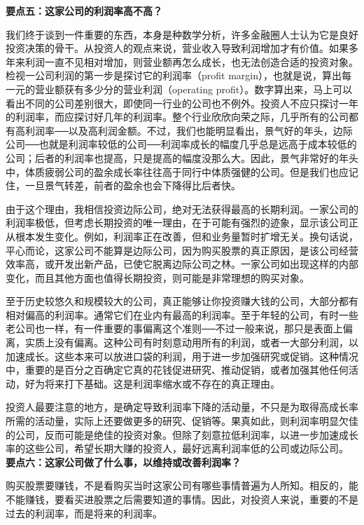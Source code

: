 \documentclass[UTF8,a4paper,zihao=-4,fontset = windows]{ctexart} %
\begin{document}
\textbf{要点五：这家公司的利润率高不高？}


我们终于谈到一件重要的东西，本身是种数学分析，许多金融圈人士认为它是良好投资决策的骨干。从投资人的观点来说，营业收入导致利润增加才有价值。如果多年来利润一直不见相对增加，则营业额再怎么成长，也无法创造合适的投资对象。检视一公司利润的第一步是探讨它的利润率（profit margin），也就是说，算出每一元的营业额获有多少分的营业利润（operating profit）。数字算出来，马上可以看出不同的公司差别很大，即使同一行业的公司也不例外。投资人不应只探讨一年的利润率，而应探讨好几年的利润率。整个行业欣欣向荣之际，几乎所有的公司都有高利润率──以及高利润金额。不过，我们也能明显看出，景气好的年头，边际公司──也就是利润率较低的公司──利润率成长的幅度几乎总是远高于成本较低的公司；后者的利润率也提高，只是提高的幅度没那么大。因此，景气非常好的年头中，体质疲弱公司的盈余成长率往往高于同行中体质强健的公司。但是我们也应记住，一旦景气转差，前者的盈余也会下降得比后者快。

由于这个理由，我相信投资边际公司，绝对无法获得最高的长期利润。一家公司的利润率极低，但考虑长期投资的唯一理由，在于可能有强烈的迹象，显示该公司正从根本发生变化。例如，利润率正在改善，但和业务量暂时扩增无关。换句话说，平心而论，这家公司不能算是边际公司，因为购买股票的真正原因，是该公司经营效率高，或开发出新产品，已使它脱离边际公司之林。一家公司如出现这样的内部变化，而且其他方面也值得长期投资，则可能是非常理想的购买对象。

至于历史较悠久和规模较大的公司，真正能够让你投资赚大钱的公司，大部分都有相对偏高的利润率。通常它们在业内有最高的利润率。至于年轻的公司，有时一些老公司也一样，有一件重要的事偏离这个准则──不过一般来说，那只是表面上偏离，实质上没有偏离。这种公司有时刻意动用所有的利润，或者一大部分利润，以加速成长。这些本来可以放进口袋的利润，用于进一步加强研究或促销。这种情况中，重要的是百分之百确定它真的花钱促进研究、推动促销，或者加强其他任何活动，好为将来打下基础。这是利润率缩水或不存在的真正理由。

投资人最要注意的地方，是确定导致利润率下降的活动量，不只是为取得高成长率所需的活动量，实际上还要做更多的研究、促销等。果真如此，则利润率明显欠佳的公司，反而可能是绝佳的投资对象。但除了刻意拉低利润率，以进一步加速成长率的这些公司，希望长期大赚的投资人，最好远离利润率低的公司或边际公司。
\\

\textbf{要点六：这家公司做了什么事，以维持或改善利润率？}


购买股票要赚钱，不是看购买当时这家公司有哪些事情普遍为人所知。相反的，能不能赚钱，要看买进股票之后需要知道的事情。因此，对投资人来说，重要的不是过去的利润率，而是将来的利润率。
\end{document}
